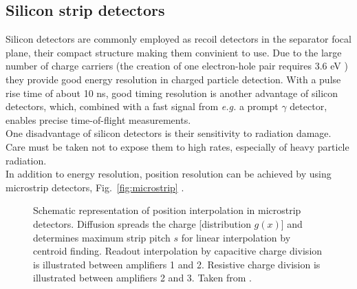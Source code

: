 \subsection{Silicon strip detectors}
Silicon detectors are commonly employed as recoil detectors in the separator focal plane, their compact structure making them convinient to use. Due to the large number of charge carriers (the creation of one electron-hole pair requires 3.6 eV \cite{kemm88}) they provide good energy resolution in charged particle detection. With a pulse rise time of about 10 ns, good timing resolution is another advantage of silicon detectors, which, combined with a fast signal from {\it e.g.} a prompt $\gamma$ detector, enables precise time-of-flight measurements. \\
One disadvantage of silicon detectors is their sensitivity to radiation damage. Care must be taken not to expose them to high rates, especially of heavy particle radiation.\\
In addition to energy resolution, position resolution can be achieved by using microstrip detectors, Fig.\ \ref{fig:microstrip} \cite{rade84}.
%
\begin{figure}
\centering
{}
\caption{Schematic representation of position interpolation in microstrip detectors. Diffusion spreads the charge [distribution $g(x)$] and determines maximum strip pitch $s$ for linear interpolation by centroid finding. Readout interpolation by capacitive charge division is illustrated between amplifiers 1 and 2. Resistive charge division is illustrated between amplifiers 2 and 3. Taken from \cite{rade84}.}
\label{fig:mirostrip}
\end{figure}
